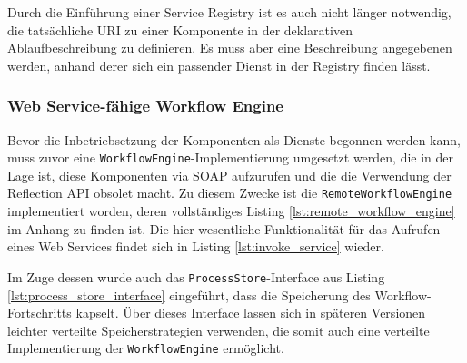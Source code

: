  

  Durch die Einführung einer Service Registry ist es auch nicht länger notwendig, die tatsäch\-liche URI zu einer Komponente in der deklarativen Ablaufbeschreibung zu definieren. Es muss aber eine Beschreibung angegebenen werden, anhand derer sich ein passender Dienst in der Registry finden lässt.
  

\subsubsection{Web Service-fähige Workflow Engine} %
\label{ssub:web_service_faehige_workflow_engine}

  Bevor die Inbetriebsetzung der Komponenten als Dienste begonnen werden kann, muss zuvor eine \verb!WorkflowEngine!-Implementierung umgesetzt werden, die in der Lage ist, diese Komponenten via SOAP aufzurufen und die die Verwendung der Reflection API obsolet macht. Zu diesem Zwecke ist die \verb!RemoteWorkflowEngine! implementiert worden, deren vollständiges Listing \ref{lst:remote_workflow_engine} im Anhang zu finden ist. Die hier wesentliche Funktionalität für das Aufrufen eines Web Services findet sich in Listing \ref{lst:invoke_service} wieder.
  
  
  
  Im Zuge dessen wurde auch das \verb!ProcessStore!-Interface aus Listing \ref{lst:process_store_interface} eingeführt, dass die Speicherung des Workflow-Fortschritts kapselt. Über dieses Interface lassen sich in späteren Versionen leichter verteilte Speicherstrategien verwenden, die somit auch eine verteilte Implementierung der \verb!WorkflowEngine! ermöglicht.
  
  \pagebreak
  
  
  
